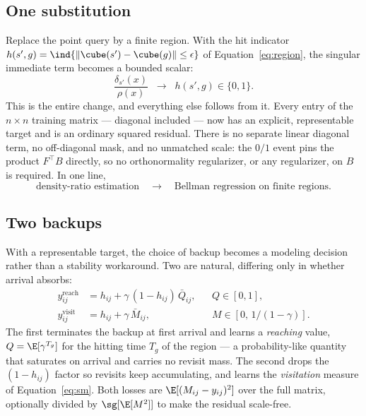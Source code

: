 \subsection{One substitution}
\label{sec:substitution}

Replace the point query by a finite region. With the hit indicator
$h(s',g)=\ind{\|\cube(s')-\cube(g)\|\le\epsilon}$ of Equation~\ref{eq:region}, the
singular immediate term becomes a bounded scalar:
\begin{equation}
\label{eq:substitution}
\frac{\delta_{s'}(x)}{\rho(x)}
\;\;\longrightarrow\;\;
h(s',g) \in \{0,1\}.
\end{equation}
This is the entire change, and everything else follows from it. Every entry of the
$n\times n$ training matrix --- diagonal included --- now has an explicit,
representable target and is an ordinary squared residual. There is no separate
linear diagonal term, no off-diagonal mask, and no unmatched scale: the $0/1$
event pins the product $F^{\top}B$ directly, so no orthonormality regularizer, or
any regularizer, on $B$ is required. In one line,
\[
\text{density-ratio estimation}
\quad\longrightarrow\quad
\text{Bellman regression on finite regions}.
\]

\subsection{Two backups}
\label{sec:backups}

With a representable target, the choice of backup becomes a modeling decision
rather than a stability workaround. Two are natural, differing only in whether
arrival absorbs:
\begin{align}
\label{eq:backups}
y^{\mathrm{reach}}_{ij} &= h_{ij} + \gamma\,(1-h_{ij})\,\bar Q_{ij},
&& Q \in [0,1], \\
y^{\mathrm{visit}}_{ij} &= h_{ij} + \gamma\,\bar M_{ij},
&& M \in [0,\,1/(1-\gamma)].
\end{align}
The first terminates the backup at first arrival and learns a \emph{reaching}
value, $Q=\E[\gamma^{T_g}]$ for the hitting time $T_g$ of the region --- a
probability-like quantity that saturates on arrival and carries no revisit mass.
The second drops the $(1-h_{ij})$ factor so revisits keep accumulating, and learns
the \emph{visitation} measure of Equation~\ref{eq:sm}. Both losses are
$\E[(M_{ij}-y_{ij})^2]$ over the full matrix, optionally divided by
$\sg[\E[M^2]]$ to make the residual scale-free.

